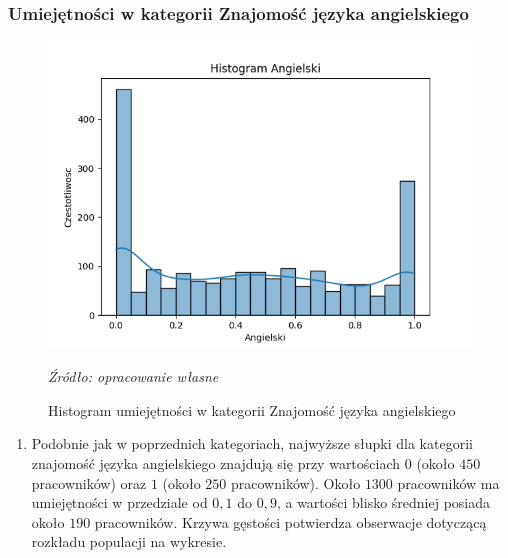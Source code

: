         \subsubsection{Umiejętności w kategorii Znajomość języka angielskiego}
        \begin{figure}[H]
            \centering
            \includegraphics[width=\linewidth]{chapters/Images/hist_angielski.png}
            \cprotect\caption{Histogram umiejętności w kategorii Znajomość języka angielskiego}
            \textit{Źródło: opracowanie własne} 
            \label{fig:hist_ang}
        \end{figure}

        \begin{enumerate}
            \item Podobnie jak w poprzednich kategoriach, najwyższe słupki dla kategorii znajomość języka angielskiego znajdują się przy wartościach $0$ (około $450$ pracowników) oraz $1$ (około $250$ pracowników). Około $1300$ pracowników ma umiejętności w przedziale od $0,1$ do $0,9$, a wartości blisko średniej posiada około $190$ pracowników. Krzywa gęstości potwierdza obserwacje dotyczącą rozkładu populacji na wykresie.
        \end{enumerate}
        
